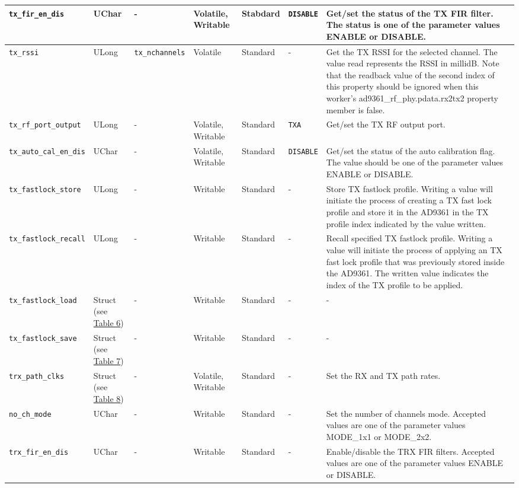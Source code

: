 \documentclass{article}
\begin{document}
\begin{landscape}
\begin{scriptsize}
\begin{longtable}{|p{3.6cm}|p{8.1cm}|p{1.4cm}|p{1.3cm}|p{1.4cm}|p{2.5cm}|p{3.6cm}|}
			\hline
			\verb+tx_fir_en_dis+ & UChar & - & Volatile, Writable & Stabdard & \verb+DISABLE+ & Get/set the status of the TX FIR filter. The status is one of the parameter values ENABLE or DISABLE. \\
			\hline
			\verb+tx_rssi+ & ULong & \verb+tx_nchannels+ & Volatile & Standard & - & Get the TX RSSI for the selected channel. The value read represents the RSSI in millidB. Note that the readback value of the second index of this property should be ignored when this worker's ad9361\_rf\_phy.pdata.rx2tx2 property member is false. \\
			\hline
			\verb+tx_rf_port_output+ & ULong & - & Volatile, Writable & Standard & \verb+TXA+ & Get/set the TX RF output port. \\
			\hline
			\verb+tx_auto_cal_en_dis+ & UChar & - & Volatile, Writable & Standard & \verb+DISABLE+ & Get/set the status of the auto calibration flag. The value should be one of the parameter values ENABLE or DISABLE. \\
			\hline
			\verb+tx_fastlock_store+ & ULong & - & Writable & Standard & - & Store TX fastlock profile. Writing a value will initiate the process of creating a TX fast lock profile and store it in the AD9361 in the TX profile index indicated by the value written. \\
			\hline
			\verb+tx_fastlock_recall+ &  ULong & - & Writable & Standard & - & Recall specified TX fastlock profile. Writing a value will initiate the process of applying an TX fast lock profile that was previously stored inside the AD9361. The written value indicates the index of the TX profile to be applied. \\
			\hline
			\verb+tx_fastlock_load+ & Struct (see \hyperlink{tab6}{Table 6}) & - & Writable & Standard & - & - \\
			\hline
			\verb+tx_fastlock_save+ & Struct (see \hyperlink{tab7}{Table 7}) & - & Writable & Standard & - & - \\
			\hline
			\verb+trx_path_clks+ & Struct (see \hyperlink{tab8}{Table 8}) & - & Volatile, Writable & Standard & - & Set the RX and TX path rates. \\
			\hline
			\verb+no_ch_mode+ & UChar & - & Writable & Standard & - & Set the number of channels mode. Accepted values are one of the parameter values MODE\_1x1 or MODE\_2x2. \\
			\hline
			\verb+trx_fir_en_dis+ & UChar & - & Writable & Standard & - & Enable/disable the TRX FIR filters. Accepted values are one of the parameter values ENABLE or DISABLE.\\

\end{longtable}
\end{scriptsize}
\end{landscape}
\end{document}
